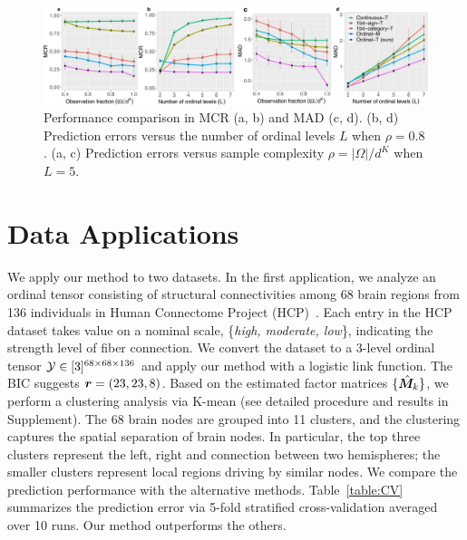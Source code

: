 \documentclass{article}
\theoremstyle{plain}
\theoremstyle{definition}
\begin{document}
\begin{figure}[t]
\centering\includegraphics[width=14cm]{panel2.pdf}
\vspace{-.4cm}
\caption{\footnotesize Performance comparison in MCR (a, b) and MAD (c, d). (b, d) Prediction errors versus the number of ordinal levels $L$ when $\rho=0.8$. (a, c) Prediction errors versus sample complexity $\rho=|\Omega|/d^K$ when $L=5$. }\label{fig:compare}
\vspace{-.6cm}
\end{figure}



\vspace{-.3cm}
\section{Data Applications}
\vspace{-.2cm}
We apply our method to two datasets. In the first application, we analyze an ordinal tensor consisting of structural connectivities among 68 brain regions from 136 individuals in Human Connectome Project (HCP)~\citep{van2013wu}. 
Each entry in the HCP dataset takes value on a nominal scale, \{{\it high, moderate, low}\}, indicating the strength level of fiber connection. We convert the dataset to a 3-level ordinal tensor $\mathcal{Y}\in[3]^{68\times 68\times 136}$ and apply our method with a logistic link function. The BIC suggests $\bm{r} = (23,23,8)$. Based on the estimated factor matrices $\{\hat {\bm M}_k\}$, we perform a clustering analysis via K-mean (see detailed procedure  and results in Supplement). The 68 brain nodes are grouped into 11 clusters, and the clustering captures the spatial separation of brain nodes. In particular, the top three clusters represent the left, right and connection between two hemispheres; the smaller clusters represent local regions driving by similar nodes. 
We compare the prediction performance with the alternative methods. Table~\ref{table:CV} summarizes the prediction error via 5-fold stratified cross-validation averaged over 10 runs. Our method outperforms the others.
\end{document}
